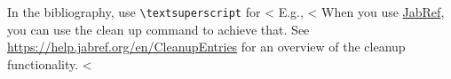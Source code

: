 \documentclass[runningheads,a4paper,ngerman]{llncs}[2022/01/12]
\begin{document}

In the bibliography, use \texttt{\textbackslash textsuperscript} for <%
E.g., <%
When you use \href{https://www.jabref.org}{JabRef}, you can use the clean up command to achieve that.
See \url{https://help.jabref.org/en/CleanupEntries} for an overview of the cleanup functionality.
<%

\renewcommand{\bibsection}{\section*{Literatur}} %

\begingroup
  \small %
\end{document}
